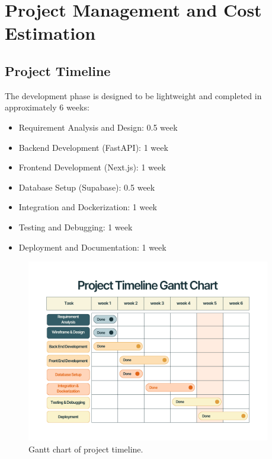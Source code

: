 \section{Project Management and Cost Estimation}

\subsection*{Project Timeline}
The development phase is designed to be lightweight and completed in approximately 6 weeks:

\begin{itemize}
    \item Requirement Analysis and Design: 0.5 week
    \item Backend Development (FastAPI): 1 week
    \item Frontend Development (Next.js): 1 week
    \item Database Setup (Supabase): 0.5 week
    \item Integration and Dockerization: 1 week
    \item Testing and Debugging: 1 week
    \item Deployment and Documentation: 1 week
\end{itemize}

\begin{figure}[htbp]
  \begin{center}
    \includegraphics[width=0.95\textwidth]{figures/gantt-chart.png}
  \end{center}
  \caption{Gantt chart of project timeline.}\label{fig:gantt-chart}
\end{figure}


